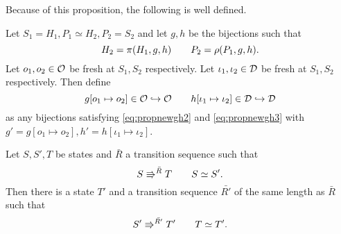 Because of this proposition, the following is well defined.

\begin{definition} \label{def:bijectionmod}
  Let $S_1 = H_1, P_1 \simeq H_2, P_2 = S_2$ and let $g, h$ be the bijections such that
  \begin{equation} 
    H_2 = \pi(H_1, g, h) \quad\quad P_2 = \rho(P_1, g, h).
  \end{equation}
  Let $o_1, o_2 \in \mathcal{O}$ be fresh at $S_1, S_2$ respectively.
  Let $\iota_1, \iota_2 \in \mathcal{D}$ be fresh at $S_1, S_2$ respectively.
  Then define
  \begin{equation}
    g[o_1 \mapsto o_2] \in \mathcal{O} \hookrightarrow \mathcal{O} 
    \quad\quad h[\iota_1 \mapsto \iota_2] \in \mathcal{D} \hookrightarrow \mathcal{D}
  \end{equation}
  as any bijections satisfying \eqref{eq:propnewgh2} and \eqref{eq:propnewgh3}
  with $g' = g[o_1 \mapsto o_2], h' = h[\iota_1 \mapsto \iota_2]$.
\end{definition}

\begin{lemma} \label{lem:lemma3}
  Let $S, S', T$ be states and $\bar{R}$ a transition sequence such that
  \begin{equation*}
    S \Rrightarrow^{\bar{R}} T \quad\quad S \simeq S'.
  \end{equation*}
  Then there is a state $T'$ and a transition sequence $\bar{R'}$ of the same
  length as $\bar{R}$ such that
  \begin{equation*}
    S' \Rrightarrow^{\bar{R'}} T' \quad\quad T \simeq T'.
  \end{equation*}
\end{lemma}


